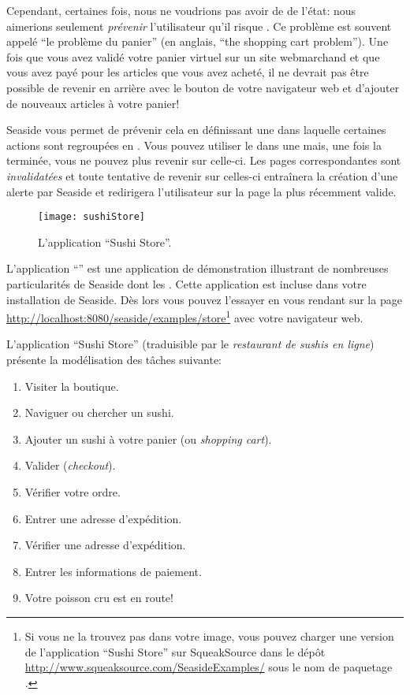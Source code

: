 \documentclass[a4paper,10pt,twoside]{book}
\begin{document}
Cependant, certaines fois, nous ne voudrions pas avoir de \backtracking
de l'état: nous aimerions seulement \emph{prévenir} l'utilisateur
qu'il risque .
Ce problème est souvent appelé ``le problème du panier'' (en anglais, ``the
shopping cart problem'').
Une fois que vous avez validé votre panier virtuel 
sur un site webmarchand
et que vous avez payé pour les articles que vous avez acheté, il ne
devrait pas être possible de revenir en arrière avec le bouton
\backbtn{} de votre navigateur web et d'ajouter de nouveaux articles à
votre panier!

Seaside vous permet de prévenir cela en définissant une \task 
dans laquelle certaines actions sont regroupées en \transactions.
Vous pouvez utiliser le \backtracking{} dans une \transaction mais,
une fois la \transaction terminée, vous ne pouvez plus revenir sur
celle-ci.
Les pages correspondantes sont \emph{invalidatées} et toute tentative
de revenir sur celles-ci entraînera la création d'une alerte par
Seaside et redirigera l'utilisateur sur la page la plus récemment
valide.

\begin{figure}[ht]
\begin{center}
\texttt{[image: sushiStore]}
\caption{L'application ``Sushi Store''.}
\end{center}
\end{figure}

L'application ``'' est une
application de démonstration illustrant de nombreuses particularités
de Seaside dont les \transactions.
Cette application est incluse dans votre installation de Seaside. Dès
lors vous pouvez l'essayer en vous rendant sur la page 
\url{http://localhost:8080/seaside/examples/store}\footnote{%
Si vous ne la trouvez pas dans votre image, vous pouvez charger une
version de l'application ``Sushi Store'' sur SqueakSource dans le dépôt
  \url{http://www.squeaksource.com/SeasideExamples/}
sous le nom de paquetage %
.} avec votre navigateur web.

L'application ``Sushi Store''
(traduisible par le \emph{restaurant de sushis en ligne})
présente la modélisation des tâches suivante:
\begin{enumerate}[itemsep=0pt]
  \item Visiter la boutique.
  \item Naviguer ou chercher un sushi.
  \item Ajouter un sushi à votre panier (ou \emph{shopping cart}).
  \item Valider (\emph{checkout}).
  \item Vérifier votre ordre.
  \item Entrer une adresse d'expédition.
  \item Vérifier une adresse d'expédition.
  \item Entrer les informations de paiement.
  \item Votre poisson cru est en route!
\end{enumerate}
\end{document}

